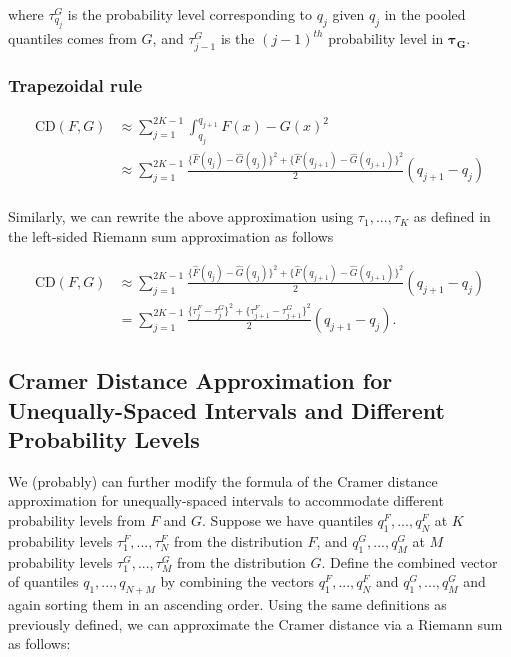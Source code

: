 \documentclass[
]{article}
\begin{document}
where \(\tau_{q_j}^G\) is the probability level corresponding to \(q_j\)
given \(q_j\) in the pooled quantiles comes from \(G\), and
\(\tau_{j-1}^G\) is the \((j-1)^{th}\) probability level in
\(\boldsymbol{\tau_G}\).

\hypertarget{trapezoidal-rule}{%
\subsubsection{Trapezoidal rule}\label{trapezoidal-rule}}

\begin{align}
\text{CD}(F,G) &\approx\sum^{2K-1}_{j=1}\int^{q_{j+1}}_{q_j}{F(x)−G(x)}^2\\
&\approx\sum^{2K-1}_{j=1}\frac{\{\hat{F}(q_j)-\hat{G}(q_j)\}^2+\{\hat{F}(q_{j+1})-\hat{G}(q_{j+1})\}^2}{2}(q_{j+1}-q_{j})\\
\end{align}

Similarly, we can rewrite the above approximation using
\(\tau_1,...,\tau_K\) as defined in the left-sided Riemann sum
approximation as follows

\begin{align}
\text{CD}(F,G) 
&\approx\sum^{2K-1}_{j=1}\frac{\{\hat{F}(q_j)-\hat{G}(q_j)\}^2+\{\hat{F}(q_{j+1})-\hat{G}(q_{j+1})\}^2}{2}(q_{j+1}-q_{j})\\
&=
\sum^{2K-1}_{j=1}\frac{\{\tau^F_j-\tau^G_j\}^2+\{\tau^F_{j+1}-\tau^G_{j+1}\}^2}{2}(q_{j+1}-q_{j}).
\end{align}

\hypertarget{cramer-distance-approximation-for-unequally-spaced-intervals-and-different-probability-levels}{%
\subsection{Cramer Distance Approximation for Unequally-Spaced Intervals
and Different Probability
Levels}\label{cramer-distance-approximation-for-unequally-spaced-intervals-and-different-probability-levels}}

We (probably) can further modify the formula of the Cramer distance
approximation for unequally-spaced intervals to accommodate different
probability levels from \(F\) and \(G\). Suppose we have quantiles
\(q_{1}^F,...,q_{N}^F\) at \(K\) probability levels
\(\tau_1^F,...,\tau_N^F\) from the distribution \(F\), and
\(q_{1}^G,...,q_{M}^G\) at \(M\) probability levels
\(\tau_1^G,...,\tau_M^G\) from the distribution \(G\). Define the
combined vector of quantiles \(q_1, . . . , q_{N+M}\) by combining the
vectors \(q_{1}^F,...,q_{N}^F\) and \(q_{1}^G,...,q_{M}^G\) and again
sorting them in an ascending order. Using the same definitions as
previously defined, we can approximate the Cramer distance via a Riemann
sum as follows:
\end{document}
